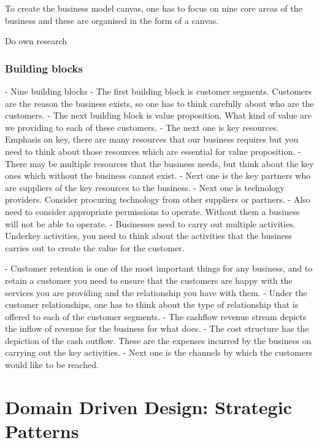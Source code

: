 \documentclass[a4paper, 11pt]{book}
\begin{document}
    To create the business model canvas, one has to focus on nine core areas of the business and these are organised in the form of a canvas.

    Do own research

    \subsection{Building blocks}
    - Nine building blocks
    - The first building block is customer segments. Customers are the reason the business exists, so one has to think carefully about who are the customers.
    - The next building block is value proposition. What kind of value are we providing to each of these customers.
    - The next one is key resources. Emphasis on key, there are many resources that our business requires but you need to think about those resources which are essential for value proposition.
    - There may be multiple resources that the business needs, but think about the key ones which without the business cannot exist.
    - Next one is the key partners who are suppliers of the key resources to the business.
    - Next one is technology providers. Consider procuring technology from other suppliers or partners.
    - Also need to consider appropriate permissions to operate. Without them a business will not be able to operate.
    - Businesses need to carry out multiple activities. Underkey activities, you need to think about the activities that the business carries out to create the value for the customer.

    - Customer retention is one of the most important things for any business, and to retain a customer you need to ensure that the customers are happy with the services you are providing and the relationship you have with them.
    - Under the customer relationships, one has to think about the type of relationship that is offered to each of the customer segments.
    - The cashflow revenue stream depicts the inflow of revenue for the business for what does.
    - The cost structure has the depiction of the cash outflow. These are the expenses incurred by the business on carrying out the key activities.
    - Next one is the channels by which the customers would like to be reached.



    \chapter{Domain Driven Design: Strategic Patterns}
\end{document}
